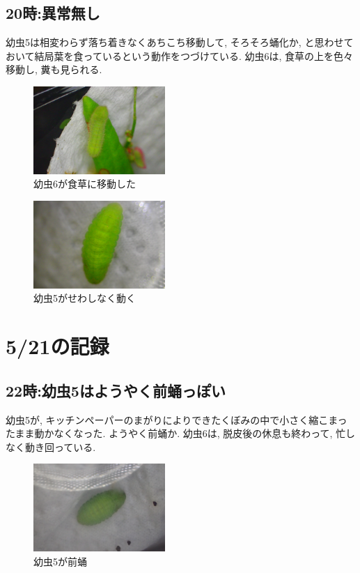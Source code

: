 \documentclass{jsarticle}
\begin{document}
\subsection{20時:異常無し}
幼虫5は相変わらず落ち着きなくあちこち移動して, そろそろ蛹化か, と思わせておいて結局葉を食っているという動作をつづけている. 幼虫6は, 食草の上を色々移動し, 糞も見られる. 

\begin{figure}[htbp]
  \begin{center}
    \includegraphics[width=5cm]{photo7/Larva6-Eating.JPG}
  \end{center}
  \caption{幼虫6が食草に移動した}
\end{figure}

\begin{figure}[htbp]
  \begin{center}
    \includegraphics[width=5cm]{photo7/Larva5-Moving.JPG}
  \end{center}
  \caption{幼虫5がせわしなく動く}
\end{figure}

\section{5/21の記録}
\subsection{22時:幼虫5はようやく前蛹っぽい}
幼虫5が, キッチンペーパーのまがりによりできたくぼみの中で小さく縮こまったまま動かなくなった. 
ようやく前蛹か. 
幼虫6は, 脱皮後の休息も終わって, 忙しなく動き回っている. 

\begin{figure}[htbp]
  \begin{center}
    \includegraphics[width=5cm]{photo8/Larva5-prePupa.JPG}
  \end{center}
  \caption{幼虫5が前蛹}
\end{figure}
\end{document}
